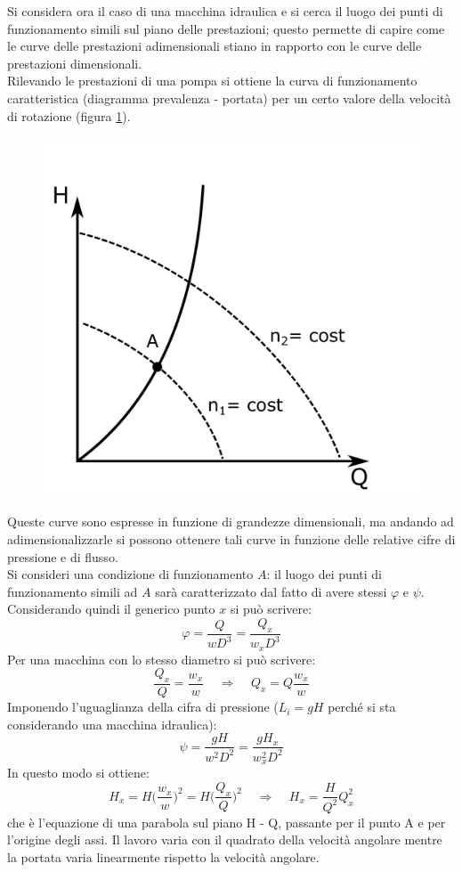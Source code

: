Si considera ora il caso di una macchina idraulica e si cerca il luogo dei punti di funzionamento simili sul piano delle prestazioni; questo permette di capire come le curve delle prestazioni adimensionali stiano in rapporto con le curve delle prestazioni dimensionali.\\
Rilevando le prestazioni di una pompa si ottiene la curva di funzionamento caratteristica (diagramma prevalenza - portata) per un certo valore della velocità di rotazione (figura \ref{fig:hq}).
\begin{figure}[h!]
\centering
  \includegraphics[width=.3\textwidth]{fig/hq.pdf}
\caption{}
\label{fig:hq}
\end{figure}
Queste curve sono espresse in funzione di grandezze dimensionali, ma andando ad adimensionalizzarle si possono ottenere tali curve in funzione delle relative cifre di pressione e di flusso.\\
Si consideri una condizione di funzionamento $A$: il luogo dei punti di funzionamento simili ad $A$ sarà caratterizzato dal fatto di avere stessi $\varphi$ e $\psi$. Considerando quindi il generico punto $x$ si può scrivere:
\begin{equation}
\varphi = \frac{Q}{w D^3}= \frac{Q_x}{w_x D^3}
\end{equation}
Per una macchina con lo stesso diametro si può scrivere:
\begin{equation}
\frac{Q_x}{Q}=\frac{w_x}{w} \;\;\;\; \Rightarrow \;\;\;\; Q_x = Q \frac{w_x}{w}
\end{equation}
Imponendo l'uguaglianza della cifra di pressione ($L_i=gH$ perché si sta considerando una macchina idraulica):
\begin{equation}
\psi = \frac{gH}{w^2 D^2}= \frac{gH_x}{w_x^2 D^2}
\end{equation}
In questo modo si ottiene:
\begin{equation}
H_x = H\bigg(\frac{w_x}{w}\bigg)^2 = H\bigg(\frac{Q_x}{Q}\bigg)^2 \;\;\;\; \Rightarrow \;\;\;\; H_x = \frac{H}{Q^2}Q_x^2
\end{equation}
che è l'equazione di una parabola sul piano H - Q, passante per il punto A e per l'origine degli assi. Il lavoro varia con il quadrato della velocità angolare mentre la portata varia linearmente rispetto la velocità angolare.

